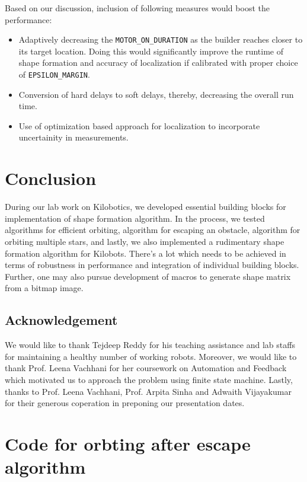 \documentclass{report}[12pt]
\begin{document}
Based on our discussion, inclusion of following measures would boost the performance:
\begin{itemize}
    \item Adaptively decreasing the \texttt{MOTOR\_ON\_DURATION} as the builder reaches closer to its target location. Doing this would significantly improve the runtime of shape formation and accuracy of localization if calibrated with proper choice of \texttt{EPSILON\_MARGIN}.
    \item Conversion of hard delays to soft delays, thereby, decreasing the overall run time.
    \item Use of optimization based approach for localization to incorporate uncertainity in measurements.
\end{itemize}

\chapter{Conclusion}
During our lab work on Kilobotics, we developed essential building blocks for implementation of shape formation algorithm. In the process, we tested algorithms for efficient orbiting, algorithm for escaping an obstacle, algorithm for orbiting multiple stars, and lastly, we also implemented a rudimentary shape formation algorithm for Kilobots. There's a lot which needs to be achieved in terms of robustness in performance and integration of individual building blocks. Further, one may also pursue development of macros to generate shape matrix from a bitmap image.
\section{Acknowledgement}
We would like to thank Tejdeep Reddy for his teaching assistance and lab staffs for maintaining a healthy number of working robots. Moreover, we would like to thank Prof. Leena Vachhani for her coursework on Automation and Feedback which motivated us to approach the problem using finite state machine. Lastly, thanks to Prof. Leena Vachhani, Prof. Arpita Sinha and Adwaith Vijayakumar for their generous coperation in preponing our presentation dates. 
\appendix
\chapter{Code for orbting after escape algorithm}
\label{c_orbit}
\end{document}
